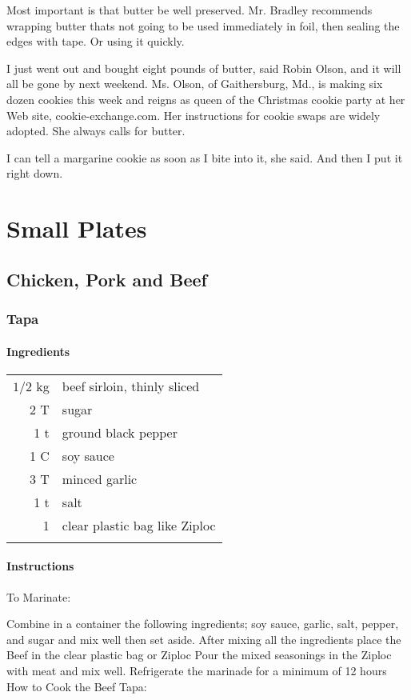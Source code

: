 \documentclass[12pt,landscape,twoside,twocolumn, openright, titlepage, draft]{book}
\begin{document}
Most important is that butter be well preserved. Mr. Bradley recommends wrapping butter thats not going to be used immediately in foil, then sealing the edges with tape. Or using it quickly.

I just went out and bought eight pounds of butter, said Robin Olson, and it will all be gone by next weekend. Ms. Olson, of Gaithersburg, Md., is making six dozen cookies this week and reigns as queen of the Christmas cookie party at her Web site, cookie-exchange.com. Her instructions for cookie swaps are widely adopted. She always calls for butter.

I can tell a margarine cookie as soon as I bite into it, she said. And then I put it right down.

\chapter{Small Plates}
\section{Chicken, Pork and Beef}
\subsection{Tapa}
\subsubsection{Ingredients}
\begin{tabular}{r p{1.5in}} \\
  $1/2$ kg & beef sirloin, thinly sliced \\
  2 T      & sugar \\
  1 t      & ground black pepper            \\
  1 C      & soy sauce  \\
  3 T      & minced garlic \\
  1 t      & salt  \\
  1        & clear plastic bag like Ziploc \\ \\
\end{tabular}
\subsubsection{Instructions}
To Marinate:

Combine in a container the following ingredients; soy sauce, garlic, salt, pepper, and sugar and mix well then set aside.
After mixing all the ingredients place the Beef in the clear plastic bag or Ziploc
Pour the mixed seasonings in the Ziploc with meat and mix well.
Refrigerate the marinade for a minimum of 12 hours
How to Cook the Beef Tapa:
\end{document}
